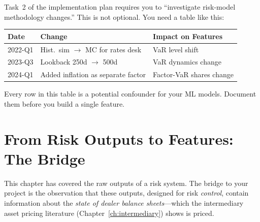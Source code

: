 \begin{projectconnection}
Task~2 of the implementation plan requires you to ``investigate
risk-model methodology changes.''  This is not optional.  You need a
table like this:

\begin{center}
\small
\begin{tabular}{@{}lll@{}}
\toprule
\textbf{Date} & \textbf{Change} & \textbf{Impact on Features} \\
\midrule
2022-Q1 & Hist.\ sim $\to$ MC for rates desk & VaR level shift \\
2023-Q3 & Lookback 250d $\to$ 500d & VaR dynamics change \\
2024-Q1 & Added inflation as separate factor & Factor-VaR shares change \\
\bottomrule
\end{tabular}
\end{center}

Every row in this table is a potential confounder for your ML models.
Document them before you build a single feature.
\end{projectconnection}


\section{From Risk Outputs to Features: The Bridge}
\label{sec:risk-to-features}

This chapter has covered the raw outputs of a risk system.  The bridge to
your project is the observation that these outputs, designed for risk
\emph{control}, contain information about the \emph{state of dealer
balance sheets}---which the intermediary asset pricing literature
(Chapter~\ref{ch:intermediary}) shows is priced.

